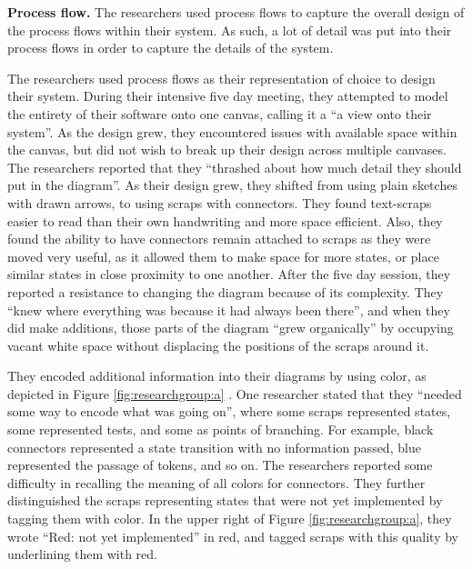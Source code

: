\textbf{Process flow. } The researchers used process flows to capture the overall design of the process flows within their system. As such, a lot of detail was put into their process flows in order to capture the details of the system.

The researchers used process flows as their representation of choice to design their system. During their intensive five day meeting, they attempted to model the entirety of their software onto one canvas, calling it a ``a view onto their system''. As the design grew, they encountered issues with available space within the canvas, but did not wish to break up their design across multiple canvases. The researchers reported that they ``thrashed about how much detail they should put in the diagram''. As their design grew, they shifted from using plain sketches with drawn arrows, to using scraps with connectors. They found text-scraps easier to read than their own handwriting and more space efficient. Also, they found the ability to have connectors remain attached to scraps as they were moved very useful, as it allowed them to make space for more states, or place similar states in close proximity to one another. After the five day session, they reported a resistance to changing the diagram because of its complexity. They ``knew where everything was because it had always been there'', and when they did make additions, those parts of the diagram ``grew organically'' by occupying vacant white space without displacing the positions of the scraps around it.

They encoded additional information into their diagrams by using color, as depicted in Figure \ref{fig:researchgroup:a} . One researcher stated that they ``needed some way to encode what was going on'', where some scraps represented states, some represented tests, and some as points of branching. For example, black connectors represented a state transition with no information passed, blue represented the passage of tokens, and so on. The researchers reported some difficulty in recalling the meaning of all colors for connectors. They further distinguished the scraps representing states that were not yet implemented by tagging them with color. In the upper right of Figure \ref{fig:researchgroup:a}, they wrote ``Red: not yet implemented'' in red, and tagged scraps with this quality by underlining them with red. 


